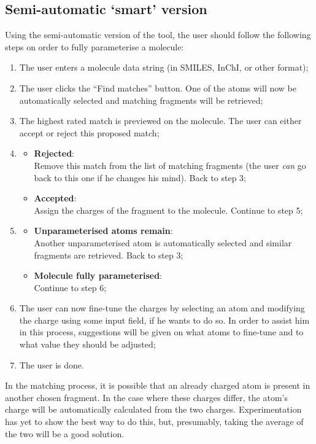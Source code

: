 \subsection{Semi-automatic `smart' version}
Using the semi-automatic version of the tool, the user should follow the following steps on order to fully parameterise a molecule:
\begin{enumerate}[itemsep=.1em, parsep=.2em, topsep=0em]
\item The user enters a molecule data string (in SMILES, InChI, or other format);
\item The user clicks the ``Find matches'' button. One of the atoms will now be automatically selected and matching fragments will be retrieved;
\item The highest rated match is previewed on the molecule. The user can either accept or reject this proposed match;
\item
\begin{itemize}[leftmargin=0cm, itemsep=.1em, parsep=.1em]
\item[]{\bf Rejected}:\\Remove this match from the list of matching fragments (the user \emph{can} go back to this one if he changes his mind). Back to step 3;
\item[] {\bf Accepted}:\\Assign the charges of the fragment to the molecule. Continue to step 5;
\end{itemize}
\item
\begin{itemize}[leftmargin=0cm, itemsep=.1em, parsep=.1em]
\item[]{\bf Unparameterised atoms remain}:\\Another unparameterised atom is automatically selected and similar fragments are retrieved. Back to step 3;
\item[] {\bf Molecule fully parameterised}:\\Continue to step 6;
\end{itemize}
\item The user can now fine-tune the charges by selecting an atom and modifying the charge using some input field, if he wants to do so. In order to assist him in this process, suggestions will be given on what atoms to fine-tune and to what value they should be adjusted;
\item The user is done.
\end{enumerate}

\noindent
In the matching process, it is possible that an already charged atom is present in another chosen fragment. In the case where these charges differ, the atom's charge will be automatically calculated from the two charges. Experimentation has yet to show the best way to do this, but, presumably, taking the average of the two will be a good solution.


